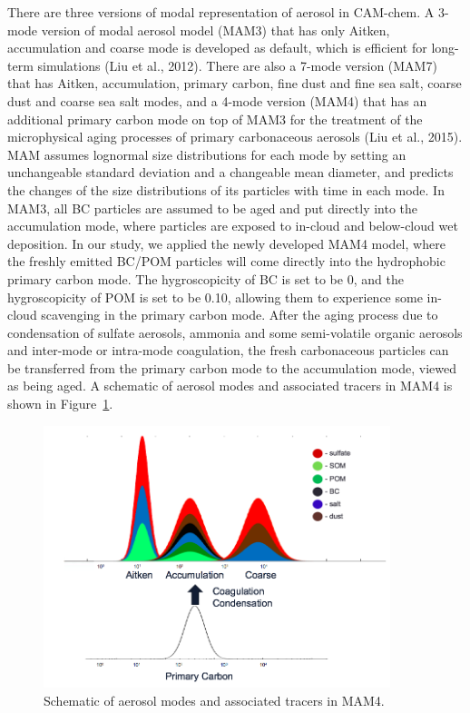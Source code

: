 \documentclass[12pt]{article}
\begin{document}
		There are three versions of modal representation of aerosol in CAM-chem. A 3-mode version of modal aerosol model (MAM3) that has only Aitken, accumulation and coarse mode is developed as default, which is efficient for long-term simulations (Liu et al., 2012). There are also a 7-mode version (MAM7) that has Aitken, accumulation, primary carbon, fine dust and fine sea salt, coarse dust and coarse sea salt modes, and a 4-mode version (MAM4) that has an additional primary carbon mode on top of MAM3 for the treatment of the microphysical aging processes of primary carbonaceous aerosols (Liu et al., 2015). MAM assumes lognormal size distributions for each mode by setting an unchangeable standard deviation and a changeable mean diameter, and predicts the changes of the size distributions of its particles with time in each mode. In MAM3, all BC particles are assumed to be aged and put directly into the accumulation mode, where particles are exposed to in-cloud and below-cloud wet deposition. In our study, we applied the newly developed MAM4 model, where the freshly emitted BC/POM particles will come directly into the hydrophobic primary carbon mode. The hygroscopicity of BC is set to be 0, and the hygroscopicity of POM is set to be 0.10, allowing them to experience some in-cloud scavenging in the primary carbon mode. After the aging process due to condensation of sulfate aerosols, ammonia and some semi-volatile organic aerosols and inter-mode or intra-mode coagulation, the fresh carbonaceous particles can be transferred from the primary carbon mode to the accumulation mode, viewed as being aged. A schematic of aerosol modes and associated tracers in MAM4 is shown in Figure~\ref{fig_P1}.
		\begin{figure}[H] 
			\begin{center}
				\includegraphics[width = 0.9\textwidth]{Figure01}
				\caption[]{\label{fig_P1} Schematic of aerosol modes and associated tracers in MAM4.}
			\end{center}
		\end{figure}
			
\end{document}
